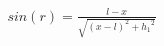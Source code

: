 \documentclass[preview]{standalone}
\begin{document}
\begin{align*}
sin(r) = \frac{l-x}{\sqrt{(x-l)^2 + {h_1}^2}}
\end{align*}
\end{document}
